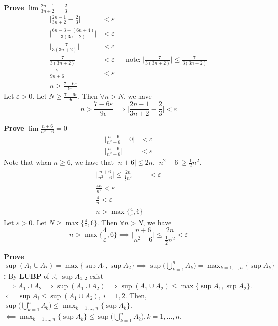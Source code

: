 \documentclass{letter}
\begin{document}
\textbf{Prove $\lim \frac{2n - 1}{3n + 2} = \frac{2}{3}$}
\begin{align*}
  \bigg| \frac{2n - 1}{3n + 2} - \frac{2}{3} \bigg| &< \varepsilon \\
  \bigg| \frac{6n - 3 - (6n + 4)}{3(3n + 2)} \bigg| &< \varepsilon \\
  \bigg| \frac{-7}{3(3n + 2)} \bigg| &< \varepsilon \\
  \frac{7}{3(3n + 2)} &< \varepsilon && \text{note: } \bigg|
                                        \frac{-7}{3(3n + 2)} \bigg|
                                        \leq \frac{7}{3(3n + 2)} \\
  \frac{7}{9n + 6} &< \varepsilon \\
  n > \frac{7 - 6\varepsilon}{9\epsilon}
\end{align*}
Let $\varepsilon > 0$. Let $N \geq \frac{7 - 6\varepsilon}{9\epsilon}$. Then
$\forall n > N$, we have
\[n > \frac{7 - 6\varepsilon}{9\epsilon} \implies \bigg|
  \frac{2n - 1}{3n + 2} - \frac{2}{3} \bigg| < \varepsilon\] 

\textbf{Prove $\lim \frac{n + 6}{n^2 - 6} = 0$}
\begin{align*}
  \bigg| \frac{n + 6}{n^2 - 6} - 0 \bigg| &< \varepsilon \\
  \bigg| \frac{n + 6}{n^2 - 6} \bigg| &< \varepsilon
\end{align*}
Note that when $n \geq 6$, we have that $|n + 6| \leq 2n$, $|n^2 - 6|
\geq \frac{1}{2}n^2$.
\begin{align*}
  \bigg| \frac{n + 6}{n^2 - 6} \bigg| \leq \frac{2n}{\frac{1}{2}n^2}
  &< \varepsilon \\
  \frac{4n}{n^2} < \varepsilon \\
  \frac{4}{n} < \varepsilon \\
  n > \max{\{\frac{4}{\varepsilon}, 6\}}
\end{align*}
Let $\varepsilon > 0$. Let $N \geq \max{\{\frac{4}{\varepsilon}, 6\}}$. Then
$\forall n > N$, we have
\[n > \max{\{\frac{4}{\varepsilon}, 6\}} \implies \bigg| \frac{n + 6}{n^2 - 6}
  \bigg| \leq \frac{2n}{\frac{1}{2}n^2} < \varepsilon\]

\textbf{Prove $\sup{(A_1 \cup A_2)} = \max{\{\sup{A_1}, \sup{A_2}\}}
  \implies \sup\bigg(\bigcup_{k = 1}^n A_k\bigg) = \max_{k = 1, \ldots,
    n}{\{\sup{A_k}\}}$:} By \textbf{LUBP} of $\mathbb{R}$,
$\sup{A_{1,2}}$ exist $ \implies A_1 \cup A_2 \implies \sup{(A_1 \cup
  A_2)} \implies \sup{(A_1 \cup A_2)} \leq \max{\{\sup{A_1},
  \sup{A_2}\}}$. $\impliedby \sup{A_i} \leq \sup{(A_1 \cup A_2)}, \ i
= 1, 2$. Then, $\sup\bigg(\bigcup_{k = 1}^n A_k\bigg) \leq \max_{k = 1, \ldots,
    n}{\{\sup{A_k}\}}$. $\impliedby \max_{k = 1, \ldots,
    n}{\{\sup{A_k}\}} \leq \sup\bigg(\bigcup_{k = 1}^n A_k\bigg), k =
  1, \ldots, n$.
\end{document}
